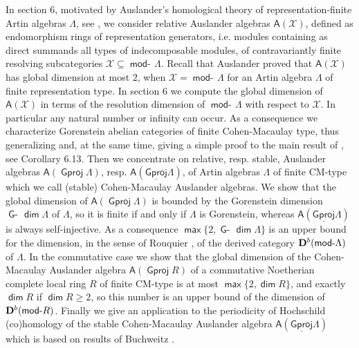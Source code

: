 \documentclass[oneside, a4paper,reqno]{amsart}
\numberwithin{equation}{section}
\theoremstyle{definition}
\begin{document}
In section 6, motivated by Auslander's homological theory of
representation-finite Artin algebras $\Lambda$, see
\cite{Auslander:queen}, we consider relative Auslander algebras
$\mathsf{A}({\mathcal X})$, defined as endomorphism rings of representation
generators, i.e. modules containing as direct summands all types of
indecomposable modules, of contravariantly finite resolving
subcategories ${\mathcal X} \subseteq \operatorname*{\mathsf{mod}-\!}\Lambda$. Recall that Auslander
proved that $\mathsf{A}({\mathcal X})$ has
global dimension at most $2$, when ${\mathcal X} = \operatorname*{\mathsf{mod}-\!}\Lambda$ for an Artin algebra $\Lambda$
of finite representation type. In section $6$ we compute the global
dimension of $\mathsf{A}({\mathcal X})$  in terms of the resolution dimension
of $\operatorname*{\mathsf{mod}-\!}\Lambda$ with respect to ${\mathcal X}$. In particular any natural
number or infinity can occur. As a consequence we characterize Gorenstein abelian categories of finite Cohen-Macaulay type, thus generalizing and,  at the same time, giving a simple proof to the main result of \cite{LiZhang}, see Corollary 6.13. Then we concentrate on relative, resp.
stable, Auslander algebras $\mathsf{A}({\operatorname{\mathsf{Gproj}}\nolimits}\Lambda)$,  resp.
$\mathsf{A}({\operatorname{\underline{\mathsf{Gproj}}}\nolimits}\Lambda)$, of Artin algebras $\Lambda$ of finite
CM-type which we call (stable) Cohen-Macaulay Auslander algebras. We
show that the global dimension of $\mathsf{A}({\operatorname{\mathsf{Gproj}}\nolimits}\Lambda)$ is
bounded by the Gorenstein dimension $\operatorname*{\mathsf{G}-\!}\operatorname*{\mathsf{dim}}\Lambda$ of $\Lambda$,
so it is finite if and only if $\Lambda$ is Gorenstein, whereas
$\mathsf{A}({\operatorname{\underline{\mathsf{Gproj}}}\nolimits}\Lambda)$ is always self-injective. As a
consequence $\operatorname*{\mathsf{max}}\{2,\operatorname*{\mathsf{G}-\!}\operatorname*{\mathsf{dim}}\Lambda\}$ is an upper bound for the
dimension, in the sense of Rouquier \cite{Rouquier:Kth}, of the
derived category ${\bf D}^{b}(\operatorname*{\mathsf{mod}-\!}\Lambda)$ of $\Lambda$.  In the
commutative case we show that the global dimension of the
Cohen-Macaulay Auslander algebra $\mathsf{A}({\operatorname{\mathsf{Gproj}}\nolimits} R)$ of a
commutative Noetherian complete local ring $R$ of finite CM-type is
at most $\operatorname*{\mathsf{max}}\{2,\operatorname*{\mathsf{dim}} R\}$, and exactly $\operatorname*{\mathsf{dim}} R$ if $\operatorname*{\mathsf{dim}} R \geq
2$, so this number is an upper bound of the dimension of ${\bf
D}^{b}(\operatorname*{\mathsf{mod}-\!} R)$. Finally we give an application to the periodicity
of Hochschild (co)homology of the stable Cohen-Macaulay Auslander
algebra $\mathsf{A}({\operatorname{\underline{\mathsf{Gproj}}}\nolimits}\Lambda)$
 which is based on
results of Buchweitz \cite{Buchweitz}.
\end{document}
